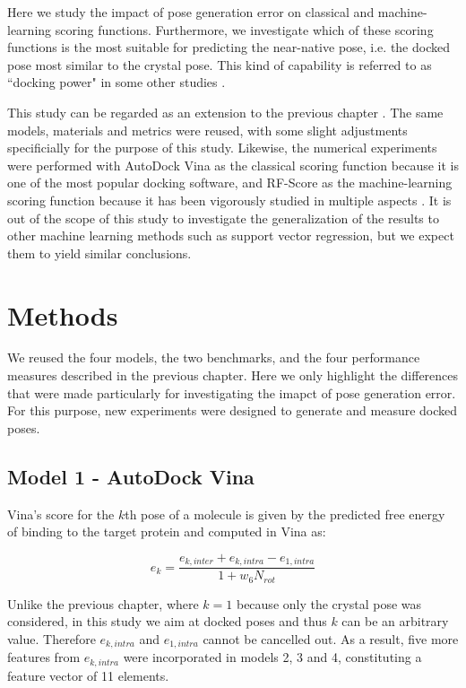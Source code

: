 Here we study the impact of pose generation error on classical and machine-learning scoring functions. Furthermore, we investigate which of these scoring functions is the most suitable for predicting the near-native pose, i.e. the docked pose most similar to the crystal pose. This kind of capability is referred to as ``docking power" in some other studies \citep{1411}.

This study can be regarded as an extension to the previous chapter \citep{1433}. The same models, materials and metrics were reused, with some slight adjustments specificially for the purpose of this study. Likewise, the numerical experiments were performed with AutoDock Vina \citep{595} as the classical scoring function because it is one of the most popular docking software, and RF-Score \citep{564} as the machine-learning scoring function because it has been vigorously studied in multiple aspects \citep{1281,1362,1370}. It is out of the scope of this study to investigate the generalization of the results to other machine learning methods such as support vector regression, but we expect them to yield similar conclusions.

\section{Methods}

We reused the four models, the two benchmarks, and the four performance measures described in the previous chapter. Here we only highlight the differences that were made particularly for investigating the imapct of pose generation error. For this purpose, new experiments were designed to generate and measure docked poses.

\subsection{Model 1 - AutoDock Vina}

Vina's score for the $k$th pose of a molecule is given by the predicted free energy of binding to the target protein and computed in Vina as:

\begin{equation}
\label{rfscore4:e_k}
e_k=\frac{e_{k,inter}+e_{k,intra}-e_{1,intra}}{1+w_6N_{rot}}
\end{equation}

Unlike the previous chapter, where $k=1$ because only the crystal pose was considered, in this study we aim at docked poses and thus $k$ can be an arbitrary value. Therefore $e_{k,intra}$ and $e_{1,intra}$ cannot be cancelled out. As a result, five more features from $e_{k,intra}$ were incorporated in models 2, 3 and 4, constituting a feature vector of 11 elements.

